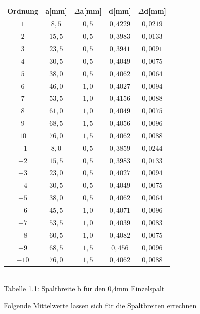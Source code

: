 \documentclass{article}
\begin{document}
\vspace{0,25cm}

\begin{center}
\begin{tabular}{|c|c|c|c|c|}
\hline
Ordnung & a[mm] & \(\Delta \)a[mm] & d[mm] & \(\Delta \)d[mm]\\
\hline
\( 1\) &	\(8,5\) &	\(0,5\) &	\(0,4229\) &	\(0,0219\)  \\ 
\( 2\) &	\(15,5\) &	\(0,5\) &	\(0,3983\) &	\(0,0133\)  \\  
\( 3\) &	\(23,5\) &	\(0,5\) &	\(0,3941\) &	\(0,0091\)  \\  
\( 4\) &	\(30,5\) &	\(0,5\) &	\(0,4049\) &	\(0,0075\)  \\    
\( 5\) &	\(38,0\) &	\(0,5\) &	\(0,4062\) &	\(0,0064\)  \\  
\( 6\) &	\(46,0\) &	\(1,0\) &	\(0,4027\) &	\(0,0094\)  \\  
\( 7\) &	\(53,5\) &	\(1,0\) &	\(0,4156\) &	\(0,0088\)  \\  
\( 8\) &	\(61,0\) &	\(1,0\) &	\(0,4049\) &	\(0,0075\)  \\  
\( 9\) &	\(68,5\) &	\(1,5\) &	\(0,4056\) &	\(0,0096\)  \\  
\( 10\) &	\(76,0\) &	\(1,5\) &	\(0,4062\) &	\(0,0088\)  \\  
\( -1\) &	\(8,0\) &	\(0,5\) &	\(0,3859\) &	\(0,0244\)  \\ 
\( -2\) &	\(15,5\) &	\(0,5\) &	\(0,3983\) &	\(0,0133\)  \\  
\( -3\) &	\(23,0\) &	\(0,5\) &	\(0,4027\) &	\(0,0094\)  \\
\( -4\) &	\(30,5\) &	\(0,5\) &	\(0,4049\) &	\(0,0075\)  \\
\( -5\) &	\(38,0\) &	\(0,5\) &	\(0,4062\) &	\(0,0064\)  \\  
\( -6\) &	\(45,5\) &	\(1,0\) &	\(0,4071\) &	\(0,0096\)  \\  
\( -7\) &	\(53,5\) &	\(1,0\) &	\(0,4039\) &	\(0,0083\)  \\  
\( -8\) &	\(60,5\) &	\(1,0\) &	\(0,4082\) &	\(0,0075\)  \\  
\( -9\) &	\(68,5\) &	\(1,5\) &	\(0,456\) &	\(0,0096\)  \\  
\( -10\) &	\(76,0\) &	\(1,5\) &	\(0,4062\) &	\(0,0088\)  \\  
\hline
\end{tabular}\\
Tabelle 1.1: Spaltbreite b für den 0,4mm Einzelspalt
\end{center}

Folgende Mittelwerte lassen sich für die Spaltbreiten errechnen
\end{document}
